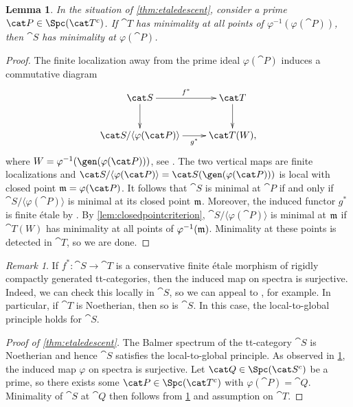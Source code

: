 \documentclass{amsart}%
\numberwithin{equation}{section}%
\newtheorem{Lem}[equation]{Lemma}
\theoremstyle{remark}
\newtheorem{Rem}[equation]{Remark}
\begin{document}
\begin{Lem}\label{lem:generalpointcriterion}
In the situation of \cref{thm:etaledescent}, consider a prime $\cat P \in \Spc(\cat T^c)$. If $\cat T$ has minimality at all points of $\varphi^{-1}(\varphi(\cat P))$, then $\cat S$ has minimality at $\varphi(\cat P)$.
\end{Lem}
\begin{proof}
The finite localization away from the prime ideal $\varphi(\cat P)$ induces a commutative diagram
\[
\xymatrix{\cat S \ar[r]^-{f^*} \ar[d] & \cat T \ar[d] \\
\cat S/\langle \varphi(\cat P)\rangle \ar[r]_-{g^*} & \cat T(W),}
\]
where $W= \varphi^{-1}(\gen(\varphi(\cat P)))$, see \cite[Prop.~1.30]{bhs1}. The two vertical maps are finite localizations and $\cat S/\langle \varphi(\cat P)\rangle = \cat S(\gen(\varphi(\cat P)))$ is local with closed point $\frak m = \varphi(\cat P)$. It follows that $\cat S$ is minimal at $\cat P$ if and only if $\cat S/\langle \varphi(\cat P)\rangle$ is minimal at its closed point $\frak m$. Moreover, the induced functor $g^*$ is finite \'etale by \cite[Ex.~5.12]{Sanders21pp}. By \cref{lem:closedpointcriterion}, $\cat S/\langle \varphi(\cat P)\rangle$ is minimal at $\frak m$ if $\cat T(W)$ has minimality at all points of $\varphi^{-1}(\frak m)$. Minimality at these points is detected in $\cat T$, so we are done.
\end{proof}

\begin{Rem}\label{rem:surjectivity}
If $f^*\colon \cat S \to \cat T$ is a conservative finite \'etale morphism of rigidly compactly generated tt-categories, then the induced map on spectra is surjective. Indeed, we can check this locally in $\cat S$, so we can appeal to \cite[Thm.~1.2]{Balmer18}, for example. In particular, if $\cat T$ is Noetherian, then so is $\cat S$. In this case, the local-to-global principle holds for $\cat S$.
\end{Rem}

\begin{proof}[Proof of \cref{thm:etaledescent}]
The Balmer spectrum of the tt-category $\cat S$ is Noetherian and hence $\cat S$ satisfies the local-to-global principle. As observed in \cref{rem:surjectivity}, the induced map $\varphi$ on spectra is surjective. Let $\cat Q \in \Spc(\cat S^c)$ be a prime, so there exists some $\cat P \in \Spc(\cat T^c)$ with $\varphi(\cat P) = \cat Q$. Minimality of $\cat S$ at $\cat Q$ then follows from \cref{lem:generalpointcriterion} and assumption on $\cat T$.
\end{proof}
\end{document}
